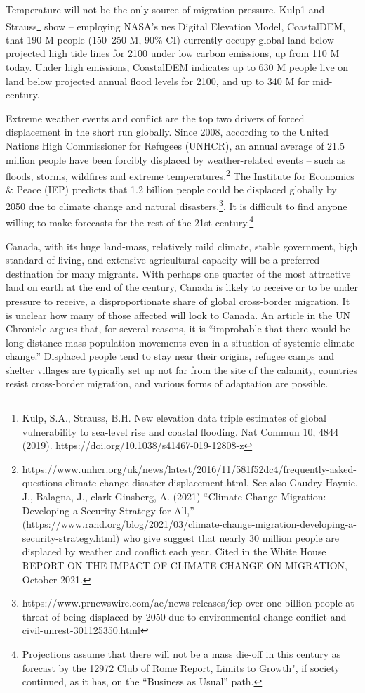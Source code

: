 Temperature will not be the only source of migration pressure. Kulp1 and Strauss\footnote{Kulp, S.A., Strauss, B.H. New elevation data triple estimates of global vulnerability to sea-level rise and coastal flooding. Nat Commun 10, 4844 (2019). https://doi.org/10.1038/s41467-019-12808-z} show – employing NASA’s nes Digital Elevation Model, CoastalDEM, that 190 M people (150–250 M, 90\% CI) currently occupy global land below projected high tide lines for 2100 under low carbon emissions, up from 110 M today. Under high emissions, CoastalDEM indicates up to 630 M people live on land below projected annual flood levels for 2100, and up to 340 M for mid-century.

Extreme weather events and conflict are the top two drivers of forced displacement in the short run globally. Since 2008, according to the United Nations High Commissioner for Refugees (UNHCR), an annual average of 21.5 million people have been forcibly displaced by weather-related events – such as floods, storms, wildfires and extreme temperatures.\footnote{https://www.unhcr.org/uk/news/latest/2016/11/581f52dc4/frequently-asked-questions-climate-change-disaster-displacement.html.  See also Gaudry Haynie, J., Balagna, J., clark-Ginsberg, A. (2021) “Climate Change Migration: Developing a Security Strategy for All,” (https://www.rand.org/blog/2021/03/climate-change-migration-developing-a-security-strategy.html) who give suggest that nearly 30 million people  are displaced by weather and  conflict each year. Cited in the White House REPORT ON THE IMPACT OF CLIMATE CHANGE ON MIGRATION, October 2021. } The Institute for Economics & Peace (IEP)  predicts that 1.2 billion people could be displaced globally by 2050 due to climate change and natural disasters.\footnote{https://www.prnewswire.com/ae/news-releases/iep-over-one-billion-people-at-threat-of-being-displaced-by-2050-due-to-environmental-change-conflict-and-civil-unrest-301125350.html}. It is difficult to find anyone willing to make forecasts for the rest of the 21st century.\footnote{Projections assume that there will not be a mass die-off in this century as forecast by the 12972 Club of Rome Report, Limits to Growth", if society continued, as it has, on the ``Business as Usual'' path. }  



Canada, with its huge land-mass, relatively mild climate, stable government, high standard of living, and extensive agricultural capacity will be a preferred destination for many migrants. With perhaps one quarter of the most attractive land on earth at the end of the century, Canada is likely to receive or to be under  pressure to receive, a disproportionate share of global cross-border migration. It is unclear how many of those affected will look to Canada. An article in the UN Chronicle argues that, for several reasons,  it is ``improbable that there would be long-distance mass population movements even in a situation of systemic climate change.''  Displaced people tend to stay near their origins, refugee camps and shelter villages are typically set up not far from the site of the calamity, countries resist cross-border migration, and various forms of adaptation are possible.  

